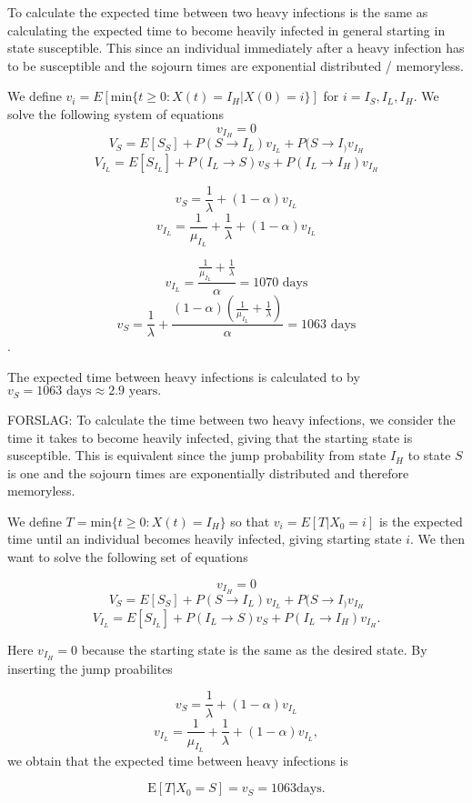 To calculate the expected time between two heavy infections is the same as calculating the expected time to become heavily infected in general starting in state susceptible. This since an individual immediately after a heavy infection  has to be susceptible and the sojourn times are exponential distributed / memoryless. 

We define $v_i = E[\text{min}\{t \geq 0: X(t) = I_H | X(0) = i\}]$ for $i = I_S, I_L, I_H$. We solve the following system of equations
$$v_{I_H} = 0$$
$$V_{S} = E[S_S] + P(S \rightarrow I_L) v_{I_L}+ P(S \rightarrow I_) v_{I_H} $$
$$V_{I_L} = E[S_{I_L}] + P(I_L \rightarrow S) v_S + P(I_L \rightarrow I_H) v_{I_H} $$


$$ v_{S} = \frac{1}{\lambda} + (1-\alpha) v_{I_L} $$
$$ v_{I_L} =  \frac{1}{\mu_{I_L}}+  \frac{1}{\lambda} + (1-\alpha) v_{I_L} $$

$$ v_{I_L} =  \frac{\frac{1}{\mu_{I_L}} +  \frac{1}{\lambda}}{\alpha} = 1070 \text{ days}$$
$$ v_S =  \frac{1}{\lambda} + \frac{ (1-\alpha)(\frac{1}{\mu_{I_L}} +  \frac{1}{\lambda})}{\alpha} = 1063 \text{ days} $$. 

The expected time between heavy infections is calculated to by $v_S = 1063 \text{ days} \approx 2.9 \text{ years.}$


FORSLAG: To calculate the time between two heavy infections, we consider the time it takes to become heavily infected, giving that the starting state is susceptible. This is equivalent since the jump probability from state $I_H$ to state $S$ is one and the sojourn times are exponentially distributed and therefore memoryless.

We define $T = \text{min}\{t \geq 0 : X(t)=I_H\}$ so that $v_i = E\left[T|X_0 = i \right]$ is the expected time until an individual becomes heavily infected, giving starting state $i$. We then want to solve the following set of equations 

$$v_{I_H} = 0$$
$$V_{S} = E[S_S] + P(S \rightarrow I_L) v_{I_L}+ P(S \rightarrow I_) v_{I_H} $$
$$V_{I_L} = E[S_{I_L}] + P(I_L \rightarrow S) v_S + P(I_L \rightarrow I_H) v_{I_H}. $$

Here $v_{I_H} = 0$ because the starting state is the same as the desired state. By inserting the jump proabilites 

$$ v_{S} = \frac{1}{\lambda} + (1-\alpha) v_{I_L} $$
$$ v_{I_L} =  \frac{1}{\mu_{I_L}}+  \frac{1}{\lambda} + (1-\alpha) v_{I_L}, $$
 we obtain that the expected time between heavy infections is
 
$$\text{E}\left[T|X_0=S \right] = v_S = 1063 \text{days}.$$ 